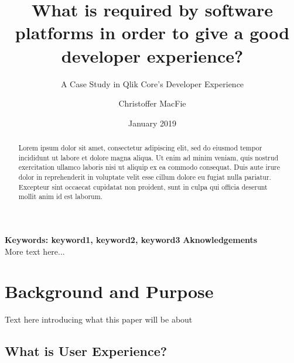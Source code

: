 \documentclass{article}
\title{What is required by software platforms in order to give a good developer experience?}
\subtitle{A Case Study in Qlik Core's Developer Experience}
\author{Christoffer MacFie}
\date{January 2019}
\begin{document}
\maketitle
\newpage
\newpage
\begin{abstract}
Lorem ipsum dolor sit amet, consectetur adipiscing elit, sed do eiusmod tempor incididunt ut labore et dolore magna aliqua. Ut enim ad minim veniam, quis nostrud exercitation ullamco laboris nisi ut aliquip ex ea commodo consequat. Duis aute irure dolor in reprehenderit in voluptate velit esse cillum dolore eu fugiat nulla pariatur. Excepteur sint occaecat cupidatat non proident, sunt in culpa qui officia deserunt mollit anim id est laborum.
\end{abstract}
\textbf{Keywords: keyword1, keyword2, keyword3}
\newpage
\Large{\textbf{Aknowledgements}} \\
\normalsize
More text here...
\newpage
\tableofcontents
\newpage

\section{Background and Purpose}

Text here introducing what this paper will be about

\subsection{What is User Experience?}
\end{document}

